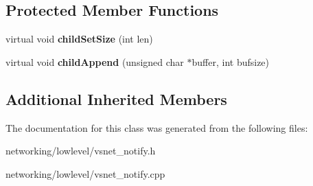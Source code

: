\subsection*{Protected Member Functions}
\begin{DoxyCompactItemize}
\item 
virtual void {\bfseries child\+Set\+Size} (int len)\hypertarget{classVsnetDownload_1_1Client_1_1TestItem_a3263e1c9c8ee4485e36d6139edcf9907}{}\label{classVsnetDownload_1_1Client_1_1TestItem_a3263e1c9c8ee4485e36d6139edcf9907}

\item 
virtual void {\bfseries child\+Append} (unsigned char $\ast$buffer, int bufsize)\hypertarget{classVsnetDownload_1_1Client_1_1TestItem_adee74917ccb0b7bafc0185ed0bc35172}{}\label{classVsnetDownload_1_1Client_1_1TestItem_adee74917ccb0b7bafc0185ed0bc35172}

\end{DoxyCompactItemize}
\subsection*{Additional Inherited Members}


The documentation for this class was generated from the following files\+:\begin{DoxyCompactItemize}
\item 
networking/lowlevel/vsnet\+\_\+notify.\+h\item 
networking/lowlevel/vsnet\+\_\+notify.\+cpp\end{DoxyCompactItemize}
